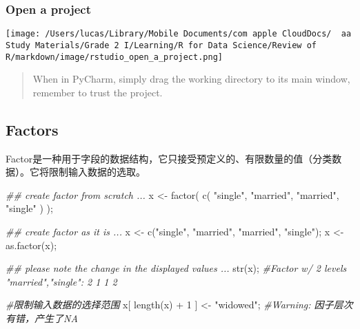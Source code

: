 \documentclass[
]{article}
\let\oldincludegraphics\includegraphics
\renewcommand{\includegraphics}[2][]{\begin{center}\oldincludegraphics[#1]{#2}\end{center}}
\newenvironment{Shaded}{}{}
\newcommand{\CommentTok}[1]{\textcolor[rgb]{0.38,0.63,0.69}{\textit{#1}}}
\newcommand{\DecValTok}[1]{\textcolor[rgb]{0.25,0.63,0.44}{#1}}
\newcommand{\DocumentationTok}[1]{\textcolor[rgb]{0.73,0.13,0.13}{\textit{#1}}}
\newcommand{\FunctionTok}[1]{\textcolor[rgb]{0.02,0.16,0.49}{#1}}
\newcommand{\NormalTok}[1]{#1}
\newcommand{\OtherTok}[1]{\textcolor[rgb]{0.00,0.44,0.13}{#1}}
\newcommand{\SpecialCharTok}[1]{\textcolor[rgb]{0.25,0.44,0.63}{#1}}
\newcommand{\StringTok}[1]{\textcolor[rgb]{0.25,0.44,0.63}{#1}}
\begin{document}
\hypertarget{open-a-project}{%
\subsubsection{Open a project}\label{open-a-project}}

\texttt{[image: /Users/lucas/Library/Mobile Documents/com~apple~CloudDocs/~~aa Study Materials/Grade 2 I/Learning/R for Data Science/Review of R/markdown/image/rstudio\_open\_a\_project.png]}

\begin{quote}
When in PyCharm, simply drag the working directory to its main window,
remember to trust the project.
\end{quote}

\hypertarget{factors}{%
\subsection{Factors}\label{factors}}

Factor是一种用于字段的数据结构，它只接受预定义的、有限数量的值（分类数据）。它将限制输入数据的选取。

\begin{Shaded}
\begin{Highlighting}[]
\DocumentationTok{\#\# create factor from scratch ... }
\NormalTok{x }\OtherTok{\textless{}{-}} \FunctionTok{factor}\NormalTok{( }\FunctionTok{c}\NormalTok{( }\StringTok{"single"}\NormalTok{, }\StringTok{"married"}\NormalTok{, }\StringTok{"married"}\NormalTok{, }\StringTok{"single"}\NormalTok{ ) );}

\DocumentationTok{\#\# create factor as it is ... }
\NormalTok{x }\OtherTok{\textless{}{-}} \FunctionTok{c}\NormalTok{(}\StringTok{"single"}\NormalTok{, }\StringTok{"married"}\NormalTok{, }\StringTok{"married"}\NormalTok{, }\StringTok{"single"}\NormalTok{);}
\NormalTok{x }\OtherTok{\textless{}{-}} \FunctionTok{as.factor}\NormalTok{(x);}

\DocumentationTok{\#\# please note the change in the displayed values ... }
\FunctionTok{str}\NormalTok{(x);}
\CommentTok{\#Factor w/ 2 levels "married","single": 2 1 1 2}

\CommentTok{\#限制输入数据的选择范围}
\NormalTok{x[ }\FunctionTok{length}\NormalTok{(x) }\SpecialCharTok{+} \DecValTok{1}\NormalTok{ ] }\OtherTok{\textless{}{-}} \StringTok{"widowed"}\NormalTok{;}
\CommentTok{\#Warning: 因子层次有错，产生了NA}
\end{Highlighting}
\end{Shaded}
\end{document}
